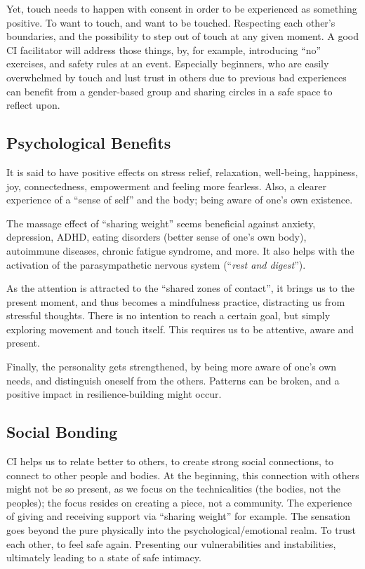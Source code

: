 Yet, touch needs to happen with consent in order to be experienced as something positive.
To want to touch, and want to be touched.
Respecting each other's boundaries, and the possibility to step out of touch at any given moment.
A good CI facilitator will address those things, by, for example, introducing ``no'' exercises, and safety rules at an event.
Especially beginners, who are easily overwhelmed by touch and lust trust in others due to previous bad experiences can benefit from a gender-based group and sharing circles in a safe space to reflect upon.

\subsection{Psychological Benefits}\label{subsec:psychological-health-benefits}

It is said to have positive effects on stress relief, relaxation, well-being, happiness, joy, connectedness, empowerment and feeling more fearless.
Also, a clearer experience of a ``sense of self'' and the body; being aware of one's own existence.

The massage effect of ``sharing weight'' seems beneficial against anxiety, depression, ADHD, eating disorders (better sense of one's own body), autoimmune diseases, chronic fatigue syndrome, and more.
It also helps with the activation of the parasympathetic nervous system (``\textit{rest and digest}'').

As the attention is attracted to the ``shared zones of contact'', it brings us to the present moment, and thus becomes a mindfulness practice, distracting us from stressful thoughts.
There is no intention to reach a certain goal, but simply exploring movement and touch itself.
This requires us to be attentive, aware and present.

Finally, the personality gets strengthened, by being more aware of one's own needs, and distinguish oneself from the others.
Patterns can be broken, and a positive impact in resilience-building might occur.

\subsection{Social Bonding}\label{subsec:social-bonding}

CI helps us to relate better to others, to create strong social connections, to connect to other people and bodies.
At the beginning, this connection with others might not be so present, as we focus on the technicalities (the bodies, not the peoples); the focus resides on creating a piece, not a community.
The experience of giving and receiving support via ``sharing weight'' for example.
The sensation goes beyond the pure physically into the psychological/emotional realm.
To trust each other, to feel safe again.
Presenting our vulnerabilities and instabilities, ultimately leading to a state of safe intimacy.

